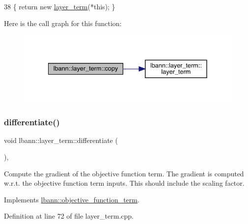 \begin{DoxyCode}
38 \{ \textcolor{keywordflow}{return} \textcolor{keyword}{new} \hyperlink{classlbann_1_1layer__term_a5c9eec2b5212adc5dc947ba2e9c88802}{layer\_term}(*\textcolor{keyword}{this}); \} 
\end{DoxyCode}
Here is the call graph for this function\+:\nopagebreak
\begin{figure}[H]
\begin{center}
\leavevmode
\includegraphics[width=335pt]{classlbann_1_1layer__term_a20820da7fd752572579a2dbaaae2ed24_cgraph}
\end{center}
\end{figure}
\mbox{\label{classlbann_1_1layer__term_a857df1636853ea9b805611c55ff791e3}} 
\subsubsection{\texorpdfstring{differentiate()}{differentiate()}}
{\footnotesize\ttfamily void lbann\+::layer\+\_\+term\+::differentiate (\begin{DoxyParamCaption}{ }\end{DoxyParamCaption})\hspace{0.3cm}{\ttfamily [override]}, {\ttfamily [virtual]}}

Compute the gradient of the objective function term. The gradient is computed w.\+r.\+t. the objective function term inputs. This should include the scaling factor. 

Implements \hyperlink{classlbann_1_1objective__function__term_ad009c3cfbe1cf2fbb6cce015b16fdac5}{lbann\+::objective\+\_\+function\+\_\+term}.



Definition at line 72 of file layer\+\_\+term.\+cpp.


